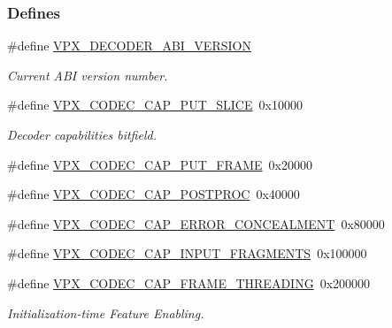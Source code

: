 \subsubsection*{\-Defines}
\begin{DoxyCompactItemize}
\item 
\hypertarget{group__decoder_ga462b459e7ae13937e1eae1776245db12}{\#define \hyperlink{group__decoder_ga462b459e7ae13937e1eae1776245db12}{\-V\-P\-X\-\_\-\-D\-E\-C\-O\-D\-E\-R\-\_\-\-A\-B\-I\-\_\-\-V\-E\-R\-S\-I\-O\-N}}\label{group__decoder_ga462b459e7ae13937e1eae1776245db12}

\begin{DoxyCompactList}\small\item\em \-Current \-A\-B\-I version number. \end{DoxyCompactList}\item 
\#define \hyperlink{group__decoder_ga9e33b8ee81025d5fc3d01b0975ad5f96}{\-V\-P\-X\-\_\-\-C\-O\-D\-E\-C\-\_\-\-C\-A\-P\-\_\-\-P\-U\-T\-\_\-\-S\-L\-I\-C\-E}~0x10000
\begin{DoxyCompactList}\small\item\em \-Decoder capabilities bitfield. \end{DoxyCompactList}\item 
\#define \hyperlink{group__decoder_ga0ef59ca8067ac1dc8c8378042277ccc8}{\-V\-P\-X\-\_\-\-C\-O\-D\-E\-C\-\_\-\-C\-A\-P\-\_\-\-P\-U\-T\-\_\-\-F\-R\-A\-M\-E}~0x20000
\item 
\#define \hyperlink{group__decoder_ga7825ade982ab85a5583d3d8a669baa3b}{\-V\-P\-X\-\_\-\-C\-O\-D\-E\-C\-\_\-\-C\-A\-P\-\_\-\-P\-O\-S\-T\-P\-R\-O\-C}~0x40000
\item 
\#define \hyperlink{group__decoder_gac44cd9e4722e1eb32a37c3eaec8d97b9}{\-V\-P\-X\-\_\-\-C\-O\-D\-E\-C\-\_\-\-C\-A\-P\-\_\-\-E\-R\-R\-O\-R\-\_\-\-C\-O\-N\-C\-E\-A\-L\-M\-E\-N\-T}~0x80000
\item 
\#define \hyperlink{group__decoder_gae89cbd3e8089803c6f4a67fc67a8c531}{\-V\-P\-X\-\_\-\-C\-O\-D\-E\-C\-\_\-\-C\-A\-P\-\_\-\-I\-N\-P\-U\-T\-\_\-\-F\-R\-A\-G\-M\-E\-N\-T\-S}~0x100000
\item 
\#define \hyperlink{group__decoder_gaee3981006b67dfdccad895cbef7936e6}{\-V\-P\-X\-\_\-\-C\-O\-D\-E\-C\-\_\-\-C\-A\-P\-\_\-\-F\-R\-A\-M\-E\-\_\-\-T\-H\-R\-E\-A\-D\-I\-N\-G}~0x200000
\begin{DoxyCompactList}\small\item\em \-Initialization-\/time \-Feature \-Enabling. \end{DoxyCompactList}\item 

\end{DoxyCompactItemize}
